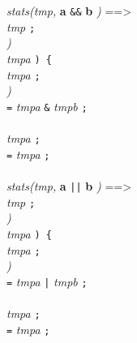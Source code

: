 \noindent
{\em stats(tmp, }{\bf a} {\tt \&\&} {\bf b} {\em )} ==> \\
 {\em tmp} {\tt ;} \\
 {\em )} \\
 {\em tmpa} {\tt ) \{} \\
\ind{} {\em tmpa} {\tt ;} \\
\ind{} {\em )} \\
\ind{} {\tt =} {\em tmpa} {\tt \&} {\em tmpb} {\tt ;}\\
\\
\ind{} {\em tmpa} {\tt ;} \\
\ind{} {\tt =} {\em tmpa} {\tt ;}\\
\ind {\tt \}}\\

\noindent
{\em stats(tmp, }{\bf a} {\tt ||} {\bf b} {\em )} ==> \\
 {\em tmp} {\tt ;} \\
 {\em )} \\
 {\em tmpa} {\tt ) \{} \\
\ind{} {\em tmpa} {\tt ;} \\
\ind{} {\em )} \\
\ind{} {\tt =} {\em tmpa} {\tt |} {\em tmpb} {\tt ;}\\
\\
\ind{} {\em tmpa} {\tt ;} \\
\ind{} {\tt =} {\em tmpa} {\tt ;}\\
\ind {\tt \}}\\
